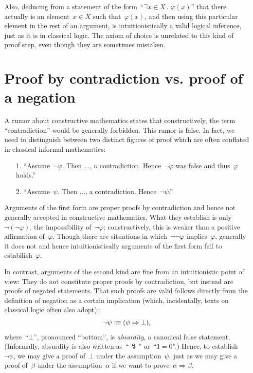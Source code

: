 \documentclass[10pt,reqno,a4paper,openany]{amsbook}
\theoremstyle{definition}
\theoremstyle{plain}
\theoremstyle{remark}
\newcommand{\?}{\,{:}\,}
\renewcommand{\_}{\mathpunct{.}\,}
\newcommand{\defequiv}{\vcentcolon\equiv}
\begin{document}
Also, deducing from a statement of the form~``$\exists x \in X\_ \varphi(x)$''
that there actually is an element~$x \in X$ such that~$\varphi(x)$, and then
using this particular element in the rest of an argument, is intuitionistically a
valid logical inference, just as it is in classical logic. The axiom of choice
is unrelated to this kind of proof step, even though they are sometimes
mistaken.


\section{Proof by contradiction vs. proof of a negation}

A rumor about constructive mathematics states that constructively, the term
``contradiction'' would be generally forbidden. This rumor is false. In fact, we need
to distinguish between two distinct figures of proof which are often conflated
in classical informal mathematics:

\begin{enumerate}
\item[1.] ``Assume~$\neg\varphi$. Then $\ldots$, a contradiction.
Hence~$\neg\varphi$ was false and thus~$\varphi$ holds.''
\item[2.] ``Assume~$\psi$. Then $\ldots$, a contradiction. Hence~$\neg\psi$.''
\end{enumerate}

Arguments of the first form are proper proofs by contradiction and hence not
generally accepted in constructive mathematics. What they establish is
only~$\neg(\neg\varphi)$, the impossibility of~$\neg\varphi$; constructively,
this is weaker than a positive affirmation of~$\varphi$. Though there are
situations in which~$\neg\neg\varphi$ implies~$\varphi$, generally it does not
and hence intuitionistically arguments of the first form fail to
estabilish~$\varphi$.

In contrast, arguments of the second kind are fine from an intuitionistic point
of view: They do not constitute proper proofs by contradiction, but instead are proofs of negated
statements. That such proofs are valid follows directly from the definition of
negation as a certain
implication (which, incidentally, texts on classical logic often also adopt):
\[ \neg\psi \defequiv (\psi \Rightarrow \bot), \]
where~``$\bot$'', pronounced ``bottom'', is \emph{absurdity}, a canonical false
statement. (Informally, absurdity is also written as~``$\lightning$'' or~``$1 = 0$''.)
Hence, to establish~$\neg\psi$, we may give a proof of~$\bot$ under
the assumption~$\psi$, just as we may give a proof of~$\beta$ under the
assumption~$\alpha$ if we want to prove~$\alpha \Rightarrow \beta$.
\end{document}
